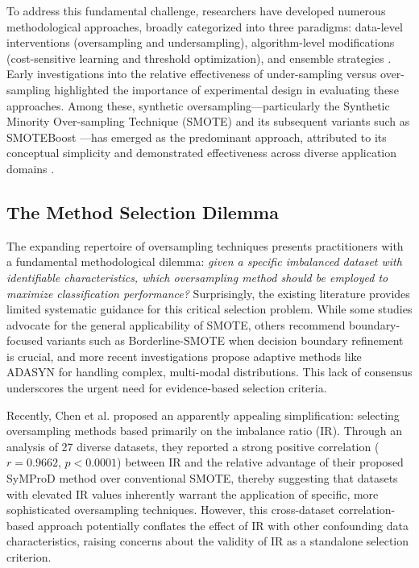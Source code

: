 \documentclass{ijSmartGrid}
\theoremstyle{definition}
\begin{document}
To address this fundamental challenge, researchers have developed numerous methodological approaches, broadly categorized into three paradigms: data-level interventions (oversampling and undersampling), algorithm-level modifications (cost-sensitive learning and threshold optimization), and ensemble strategies \cite{chawla2002smote,he2008adasyn,ling1998decision,galar2012review}. Early investigations into the relative effectiveness of under-sampling versus over-sampling \cite{drummond2003c4,estabrooks2004multiple} highlighted the importance of experimental design in evaluating these approaches. Among these, synthetic oversampling---particularly the Synthetic Minority Over-sampling Technique (SMOTE) \cite{chawla2002smote} and its subsequent variants such as SMOTEBoost \cite{chawla2003smoteboost}---has emerged as the predominant approach, attributed to its conceptual simplicity and demonstrated effectiveness across diverse application domains \cite{fernandez2018smote,vluymans2019class}.

\subsection{The Method Selection Dilemma}
\indent The expanding repertoire of oversampling techniques presents practitioners with a fundamental methodological dilemma: \textit{given a specific imbalanced dataset with identifiable characteristics, which oversampling method should be employed to maximize classification performance?} Surprisingly, the existing literature provides limited systematic guidance for this critical selection problem. While some studies advocate for the general applicability of SMOTE, others recommend boundary-focused variants such as Borderline-SMOTE when decision boundary refinement is crucial, and more recent investigations propose adaptive methods like ADASYN for handling complex, multi-modal distributions. This lack of consensus underscores the urgent need for evidence-based selection criteria.

Recently, Chen et al. \cite{chen2023syMProD} proposed an apparently appealing simplification: selecting oversampling methods based primarily on the imbalance ratio (IR). Through an analysis of 27 diverse datasets, they reported a strong positive correlation ($r=0.9662$, $p<0.0001$) between IR and the relative advantage of their proposed SyMProD method over conventional SMOTE, thereby suggesting that datasets with elevated IR values inherently warrant the application of specific, more sophisticated oversampling techniques. However, this cross-dataset correlation-based approach potentially conflates the effect of IR with other confounding data characteristics, raising concerns about the validity of IR as a standalone selection criterion.
\end{document}
